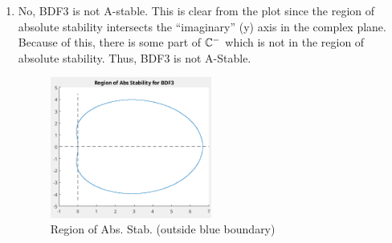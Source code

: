 \documentclass{article}
\begin{document}
\begin{enumerate}[label=\alph*)]
\begin{proof}
    Next we show consistency with order three using Taylor Expansions. 
    \begin{align*}
         \tau_{k+3}&= \frac{\bs{y}_{k+3} - \frac{18}{11}\bs{y}_{k+2} +
        \frac{9}{11}\bs{y}_{k+1} - \frac{2}{11}\bs{y}_k}{\dt} - \frac{6}{11}
        \bs{\dot{y}}_{k+3}\\
        \bs{y}_{k} &= \bs{y}_{k+3} - 3\dt \dot{\bs{y}}_{k+3} + \frac{9}{2}\dt^2\ddot{\bs{y}}_{k+3} -
        \frac{27}{6}\dt^3\dddot{\bs{y}}_{k+3} + \frac{81}{24}\dt^4\ddddot{\bs{y}}_{k+3} +
        h.o.t.\\
        \bs{y}_{k+1} &= \bs{y}_{k+3} - 2\dt \dot{\bs{y}}_{k+3} + \frac{4}{2}\dt^2\ddot{\bs{y}}_{k+3} -
        \frac{8}{6}\dt^3\dddot{\bs{y}}_{k+3} + \frac{16}{24}\dt^4\ddddot{\bs{y}}_{k+3} +
        h.o.t.\\
        \bs{y}_{k+2} &= \bs{y}_{k+3} - \dt \dot{\bs{y}}_{k+3} + \frac{1}{2}\dt^2\ddot{\bs{y}}_{k+3} -
        \frac{1}{6}\dt^3\dddot{\bs{y}}_{k+3} + \frac{1}{24}\dt^4\ddddot{\bs{y}}_{k+3}+
        h.o.t.\\
        \tau_{k+3} &= \frac{\bs{y}_{k+3}}{\dt}\left(1 + \frac{-18 +9-2}{11}\right) +
        \dot{\bs{y}}_{k+3}\left(\frac{18 - 18 + 6 - 6}{11}\right)\\
                   &+\frac{\dt}{2}\ddot{\bs{y}}\left(\frac{-18+36-18}{11}\right)+
                   \frac{\dt^2}{6}\dddot{\bs{y}_k+3}\left(\frac{18 - 72 +
                   54}{11}\right) \\ &+
                   \frac{\dt^3}{24}\ddddot{\bs{y}}_{k+3}\left(\frac{-18 + 144 -
                   161}{11}\right) + h.o.t.\\
        |\tau_{k+3}| &= \frac{-35\dt^3}{24}|\ddddot{\bs{y}_{k+3}}|
    \end{align*}
    Therefore BDF3 is consistent with order three, and since it is zero-stable,
    it is convergent with order three as well!

  \end{proof}

  \item No, BDF3 is not A-stable. This is clear from the plot since the region
  of absolute stability intersects the ``imaginary'' (y) axis in the complex
  plane. Because of this, there is some part of $\mathbb{C}^-$ which is not in the
  region of absolute stability. Thus, BDF3 is not A-Stable.

  \begin{figure}[h]
    \centering
    \includegraphics[width=0.5\textwidth]{2bAbsStabReg.png}
    \caption{Region of Abs. Stab. (outside blue boundary)}
  \end{figure}


\end{enumerate}
\end{document}
